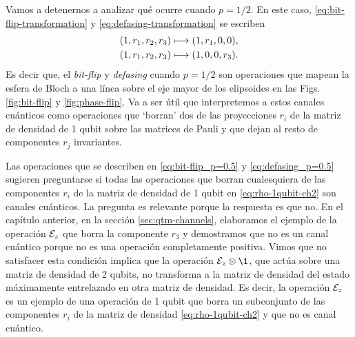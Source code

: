 Vamos a detenernos a analizar qué ocurre cuando $p=1/2$. 
En este caso, \eqref{eq:bit-flip-transformation} y
\eqref{eq:defasing-transformation} se escriben
\begin{align}\label{eq:bit-flip_p=0.5}
\qty(1,r_1,r_2,r_3)&\longmapsto \qty(1,r_1,0,0),\\
\qty(1,r_1,r_2,r_3)&\longmapsto \qty(1,0,0,r_3).\label{eq:defasing_p=0.5}
\end{align}
Es decir que, el \textit{bit-flip} y \textit{defasing} cuando $p=1/2$
son operaciones que mapean la esfera de Bloch a una línea sobre 
el eje mayor de los elipsoides en las Figs. \ref{fig:bit-flip} y \ref{fig:phase-flip}.
Va a ser útil que interpretemos a estos canales cuánticos 
como operaciones que `borran' dos de las proyecciones
$r_i$  de la matriz de densidad de 1 qubit sobre
las matrices de Pauli y que dejan al resto de componentes $r_j$ invariantes.


Las operaciones 	que se describen en \eqref{eq:bit-flip_p=0.5}
y \eqref{eq:defasing_p=0.5} sugieren preguntarse si todas las
operaciones que borran cualesquiera de las componentes $r_i$ 
de la matriz de densidad de 1 qubit 
en \eqref{eq:rho-1qubit-ch2} son canales cuánticos.
La pregunta es relevante porque la respuesta es
que no. En el capítulo anterior, en la sección 
\ref{sec:qtm-channels}, elaboramos el ejemplo de la operación $\mathcal{E}_z$
que borra la componente $r_3$ y demostramos que no es un canal 
cuántico porque no es una operación completamente positiva. 
Vimos que no satisfacer esta condición implica que la operación 
$\E_z\ot\1$, que actúa sobre una matriz de densidad de 2 qubits,
no transforma a la matriz 
de densidad del estado máximamente entrelazado en otra 
matriz de densidad.
Es decir, la operación $\mathcal{E}_z$ es un ejemplo de una 
operación de 1 qubit que borra un subconjunto de las componentes $r_i$ de 
la matriz de densidad \eqref{eq:rho-1qubit-ch2} y que no es canal cuántico.

